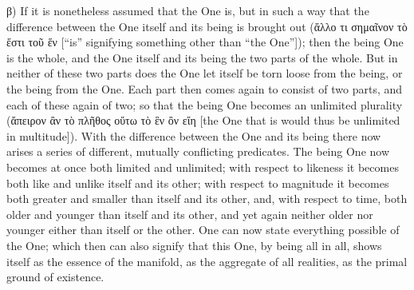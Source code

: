 \documentclass[12pt]{book}
\begin{document}
β) If it is nonetheless assumed that the One is, but in such a way that the difference between the
One itself and its being is brought out (ἄλλο τι σημαῖνον τὸ ἔστι τοῦ ἕν [``is'' signifying
something other than ``the One'']); then the being One is the whole, and the One itself and its
being the two parts of the whole. But in neither of these two parts does the One let itself be
torn loose from the being, or the being from the One. Each part then comes again to consist of two
parts, and each of these again of two; so that the being One becomes an unlimited plurality (ἄπειρον
ἂν τὸ πλῆθος οὕτω τὸ ἓν ὂν εἴη [the One that is would thus be unlimited in multitude]). With the
difference between the One and its being there now arises a series of different, mutually conflicting
predicates. The being One now becomes at once both limited and unlimited; with respect to likeness
it becomes both like and unlike itself and its other; with respect to magnitude it becomes both
greater and smaller than itself and its other, and, with respect to time, both older and younger
than itself and its other, and yet again neither older nor younger either than itself or the other.
One can now state everything possible of the One; which then can also signify that this One, by
being all in all, shows itself as the essence of the manifold, as the aggregate of all realities,
as the primal ground of existence.
\end{document}

